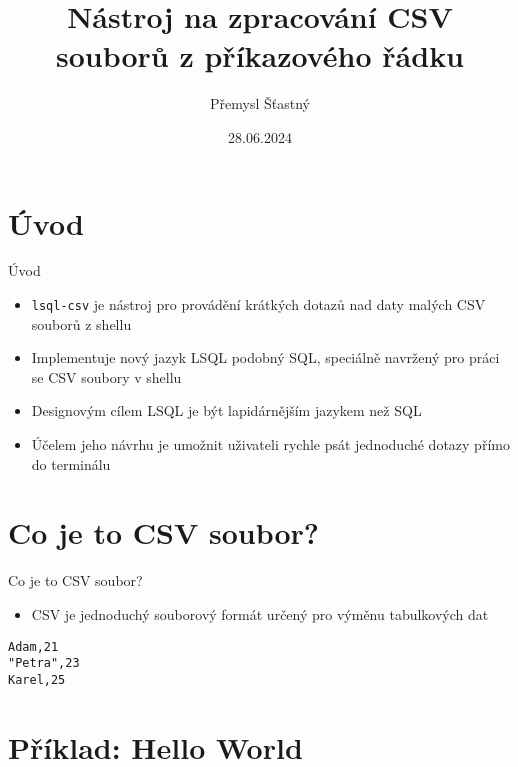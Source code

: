 \documentclass{beamer}
\title[Nástroj \icode{lsql-csv} na zpracování CSV souborů z příkazového řádku]{Nástroj \icode{lsql-csv} na zpracování CSV souborů z příkazového řádku}
\author{Přemysl Šťastný}
\institute{Univerzita Karlova}
\date{28.06.2024}
\def\icode#1{\texttt{#1}}
\begin{document}
\begin{frame}
  \titlepage
\end{frame}


\section{Úvod}

\begin{frame}{Úvod}

\begin{itemize}
  \item \icode{lsql-csv} je nástroj pro provádění krátkých dotazů nad daty malých CSV souborů z shellu
  \item Implementuje nový jazyk LSQL podobný SQL, speciálně navržený pro práci se CSV soubory v shellu
  \item Designovým cílem LSQL je být lapidárnějším jazykem než SQL
  \item Účelem jeho návrhu je umožnit uživateli rychle psát jednoduché dotazy přímo do terminálu
\end{itemize}


\end{frame}


\section{Co je to CSV soubor?}

\begin{frame}[fragile]{Co je to CSV soubor?}
\begin{itemize}
  \item CSV je jednoduchý souborový formát určený pro výměnu tabulkových dat
\end{itemize}

\vskip 0.5cm

\begin{verbatim}
Adam,21
"Petra",23
Karel,25
\end{verbatim}

\end{frame}


\section{Příklad: Hello World}
\end{document}
